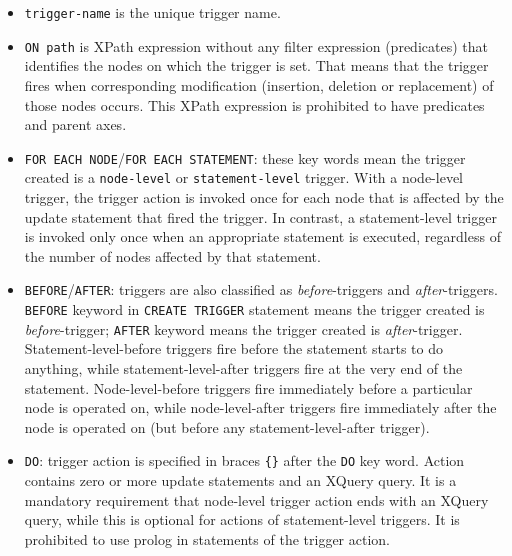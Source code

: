\documentclass[a4paper,12pt]{article}
\begin{document}
\begin{itemize}
\item \verb!trigger-name! is the unique trigger name.

\item \verb!ON path! is XPath expression without any filter expression (predicates) that identifies the nodes on which the trigger is set. That means that the trigger fires when corresponding modification (insertion, deletion or replacement) of those nodes occurs. This XPath expression is prohibited to have predicates and parent axes.

\item \verb!FOR EACH NODE!/\verb!FOR EACH STATEMENT!: these key words mean the trigger created is a \verb!node-level! or \verb!statement-level! trigger. With a node-level trigger, the trigger action is invoked once for each node that is affected by the update statement that fired the trigger. In contrast, a statement-level trigger is invoked only once when an appropriate statement is executed, regardless of the number of nodes affected by that statement.

\item \verb!BEFORE!/\verb!AFTER!: triggers are also classified as \emph{before}-triggers and \emph{after}-triggers. \verb!BEFORE! keyword in \verb!CREATE TRIGGER! statement means the trigger created is \emph{before}-trigger; \verb!AFTER! keyword means the trigger created is \emph{after}-trigger. Statement-level-before triggers fire before the statement starts to do anything, while statement-level-after triggers fire at the very end of the statement. Node-level-before triggers fire immediately before a particular node is operated on, while node-level-after triggers fire immediately after the node is operated on (but before any statement-level-after trigger).

\item \verb!DO!: trigger action is specified in braces \verb!{}! after the \verb!DO! key word. Action contains zero or more update statements and an XQuery query. It is a mandatory requirement that node-level trigger action  ends with an XQuery query, while this is optional for actions of statement-level triggers. It is prohibited to use prolog in statements of the trigger action.


\end{itemize}
\end{document}
